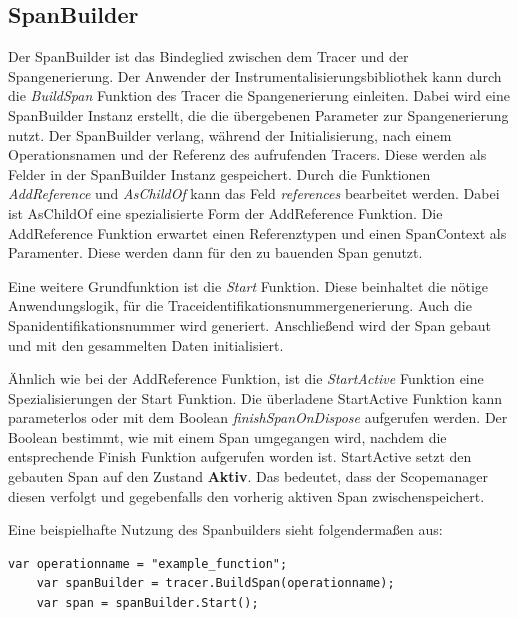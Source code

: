 \subsection{SpanBuilder}
\label{subsection:SpanBuilder}

Der SpanBuilder ist das Bindeglied zwischen dem Tracer und der Spangenerierung. Der Anwender der Instrumentalisierungsbibliothek kann durch die \emph{BuildSpan} Funktion des Tracer die Spangenerierung einleiten. Dabei wird eine SpanBuilder Instanz erstellt, die die übergebenen Parameter zur Spangenerierung nutzt. Der SpanBuilder verlang, während der Initialisierung, nach einem Operationsnamen und der Referenz des aufrufenden Tracers. Diese werden als Felder in der SpanBuilder Instanz gespeichert. Durch die Funktionen \emph{AddReference} und \emph{AsChildOf} kann das Feld \emph{references} bearbeitet werden. Dabei ist AsChildOf eine spezialisierte Form der AddReference Funktion. Die AddReference Funktion erwartet einen Referenztypen und einen SpanContext als Paramenter. Diese werden dann für den zu bauenden Span genutzt. 

Eine weitere Grundfunktion ist die \emph{Start} Funktion. Diese beinhaltet die nötige Anwendungslogik, für die Traceidentifikationsnummergenerierung. Auch die Spanidentifikationsnummer wird generiert. Anschließend wird der Span gebaut und mit den gesammelten Daten initialisiert.

Ähnlich wie bei der AddReference Funktion, ist die \emph{StartActive} Funktion eine Spezialisierungen der Start Funktion. Die überladene StartActive Funktion kann parameterlos oder mit dem Boolean \emph{finishSpanOnDispose} aufgerufen werden. Der Boolean bestimmt, wie mit einem Span umgegangen wird, nachdem die entsprechende Finish Funktion aufgerufen worden ist. StartActive setzt den gebauten Span auf den Zustand \textbf{Aktiv}. Das bedeutet, dass der Scopemanager diesen verfolgt und gegebenfalls den vorherig aktiven Span zwischenspeichert.

Eine beispielhafte Nutzung des Spanbuilders sieht folgendermaßen aus:

\begin{minipage}[]{\textwidth}
	\begin{lstlisting}[frame=trBL]
	var operationname = "example_function";
	var spanBuilder = tracer.BuildSpan(operationname);
	var span = spanBuilder.Start();
	\end{lstlisting}
	\label{listing:SpanBuiler}
\end{minipage} 


